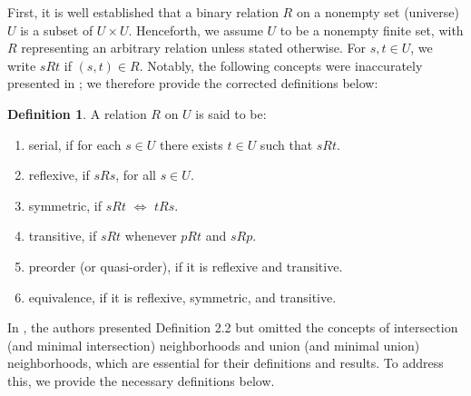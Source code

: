 \documentclass{article}
\theoremstyle{theorem}
\theoremstyle{definition}
\newtheorem{definition}{Definition}[section]
\theoremstyle{remark}
\begin{document}
First, it is well established that a binary relation $R$ on a nonempty set (universe) $U$ is a subset of $U \times U$. Henceforth, we assume $U$ to be a nonempty finite set, with $R$ representing an arbitrary relation unless stated otherwise. For $s, t \in U$, we write $sRt$ if $(s, t) \in R$. Notably, the following concepts were inaccurately presented in \cite{Al-shami 2024}; we therefore provide the corrected definitions below:
\color{black}

\begin{definition} \label{d1} \cite{Yao 1998,DeBaets1993} A relation $R$ on $U$ is said to be:
\begin{enumerate}
\item serial, if for each $s \in U$ there exists $t \in U$ such that $sRt$.
\item reflexive, if $sRs$, for all $s \in U$.
\item symmetric, if $sRt$ $\Leftrightarrow$ $tRs$.
\item transitive, if $sRt$ whenever $pRt$ and $sRp$.
\item preorder (or quasi-order), if it is reflexive and transitive.
\item equivalence, if it is reflexive, symmetric, and transitive.
\end{enumerate}
\end{definition}


In \cite{Al-shami 2024}, the authors presented Definition 2.2 but omitted the concepts of intersection  (and minimal intersection) neighborhoods and  union  (and minimal union) neighborhoods, which are essential for their definitions and results. To address this, we provide the necessary definitions below.
\end{document}
